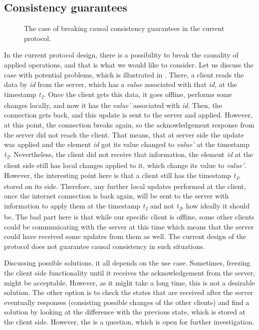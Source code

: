\subsection*{Consistency guarantees}

\begin{figure}[!htb]
    \begin{center}
    \def\svgwidth{\linewidth}
    
    \caption {The case of breaking causal consistency guarantees in the current protocol.}
    \label{fig:final}
\end{center}
\end{figure}

In the current protocol design, there is a possibility to break the causality of applied operations, and that is what we would like to consider. Let us discuss the case with potential problems, which is illustrated in . There, a client reads the data by \textit{id} from the server, which has a \textit{value} associated with that \textit{id}, at the timestamp \textit{t\textsubscript{1}}. Once the client gets this data, it goes offline, performs some changes locally, and now it has the \textit{value'} associated with \textit{id}. Then, the connection gets back, and this update is sent to the server and applied. However, at this point, the connection breaks again, so the acknowledgement response from the server did not reach the client. That means, that at server side the update was applied and the element \textit{id} got its value changed to \textit{value'} at the timestamp \textit{t\textsubscript{2}}. Nevertheless, the client did not receive that information, the element \textit{id} at the client side still has local changes applied to it, which change its value to \textit{value'}. However, the interesting point here is that a client still has the timestamp \textit{t\textsubscript{1}}, stored on its side. Therefore, any further local updates performed at the client, once the internet connection is back again, will be sent to the server with information to apply them at the timestamp \textit{t\textsubscript{1}} and not \textit{t\textsubscript{2}}, how ideally it should be. The bad part here is that while our specific client is offline, some other clients could be communicating with the server at this time which means that the server could have received some updates from them as well. The current design of the protocol does not guarantee causal consistency in such situations. 

Discussing possible solutions, it all depends on the use case. Sometimes, freezing the client side functionality until it receives the acknowledgement from the server, might be acceptable. However, as it might take a long time, this is not a desirable solution. The other option is to check the states that are received after the server eventually responses (consisting possible changes of the other clients) and find a solution by looking at the difference with the previous state, which is stored at the client side. However, the is a question, which is open for further investigation.